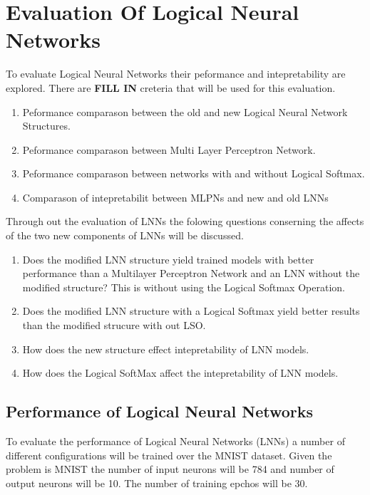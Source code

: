 \chapter{Evaluation Of Logical Neural Networks} \label{C:evaluation-lnn}
To evaluate Logical Neural Networks their peformance and intepretability are explored. There are \textbf{FILL IN} creteria that will be used for this evaluation.

\begin{enumerate}
	\item Peformance comparason between the old and new Logical Neural Network Structures.
	\item Peformance comparason between Multi Layer Perceptron Network.
	\item Peformance comparason between networks with and without Logical Softmax.
	\item Comparason of intepretabilit between MLPNs and new and old LNNs
\end{enumerate}

Through out the evaluation of LNNs the folowing questions conserning the affects of the two new components of LNNs will be discussed.

\begin{enumerate}
	\item Does the modified LNN structure yield trained models with better performance than a Multilayer Perceptron Network and an LNN without the modified structure? This is without using the Logical Softmax Operation.
	\item Does the modified LNN structure with a Logical Softmax yield better results than the modified strucure with out LSO.
	\item How does the new structure effect intepretability of LNN models.
	\item How does the Logical SoftMax affect the intepretability of LNN models.
\end{enumerate}


\section{Performance of Logical Neural Networks} \label{sec:lnn-eval-peformance}
To evaluate the performance of Logical Neural Networks (LNNs) a number of different configurations will be trained over the MNIST dataset. Given the problem is MNIST the number of input neurons will be 784 and number of output neurons will be 10. The number of training epchos will be 30.\\

